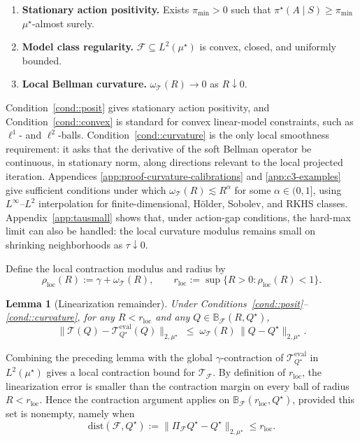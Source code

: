 \documentclass{article}
\theoremstyle{plain}
\newtheorem{lemma}{Lemma}
\theoremstyle{definition}
\theoremstyle{remark}
\begin{document}
\begin{enumerate}[label=\textbf{C\arabic*)}, ref={C\arabic*}, leftmargin=1.5em, series=cond]
\item \label{cond::posit}
\textbf{Stationary action positivity.}
Exists \(\pi_{\min}>0\) such that
\(\pi^\star(A\mid S)\ge \pi_{\min}\) \(\mu^\star\)-almost surely.

\item \label{cond::convex}
\textbf{Model class regularity.}
\(\mathcal F\subseteq L^2(\mu^\star)\) is convex, closed, and uniformly bounded.

\item \label{cond::curvature}
\textbf{Local Bellman curvature.}
\(\omega_{\mathcal T}(R)\to0\) as \(R\downarrow0\).
\end{enumerate}

Condition~\ref{cond::posit} gives stationary action positivity, and
Condition~\ref{cond::convex} is standard for convex linear-model constraints,
such as \(\ell^1\)- and \(\ell^2\)-balls. Condition~\ref{cond::curvature} is the
only local smoothness requirement: it asks that the derivative of the soft
Bellman operator be continuous, in stationary norm, along directions relevant to
the local projected iteration. Appendices \ref{app:proof-curvature-calibrations} and \ref{app:c3-examples} give sufficient conditions under
which \(\omega_{\mathcal T}(R)\lesssim R^\alpha\) for some
\(\alpha\in(0,1]\), using \(L^\infty\)--\(L^2\) interpolation for
finite-dimensional, H\"older, Sobolev, and RKHS classes.
Appendix~\ref{app:tausmall} shows that, under action-gap conditions, the
hard-max limit can also be handled: the local curvature modulus remains small on
shrinking neighborhoods as \(\tau\downarrow0\).

Define the local contraction modulus and radius by
\[
\rho_{\mathrm{loc}}(R):=\gamma+\omega_{\mathcal T}(R),
\qquad
r_{\mathrm{loc}}:=\sup\{R>0:\rho_{\mathrm{loc}}(R)<1\}.
\]


\begin{lemma}[Linearization remainder]
\label{lem:second-order-remainder}
Under Conditions~\ref{cond::posit}--\ref{cond::curvature}, for any
\(R<r_{\mathrm{loc}}\) and any
\(Q \in \mathbb B_{\mathcal F}(R,Q^\star)\),
\[
\bigl\|\mathcal{T}(Q)-\mathcal{T}^{\mathrm{eval}}_{Q^\star}(Q)\bigr\|_{2,\mu^\star}
\;\le\;
\omega_{\mathcal T}(R)\,\|Q-Q^\star\|_{2,\mu^\star}.
\]
\end{lemma}

Combining the preceding lemma with the global \(\gamma\)-contraction of
\(\mathcal T^{\mathrm{eval}}_{Q^\star}\) in \(L^2(\mu^\star)\) gives a local
contraction bound for \(\mathcal T_{\mathcal F}\). By definition of
\(r_{\mathrm{loc}}\), the linearization error is smaller than the contraction
margin on every ball of radius \(R<r_{\mathrm{loc}}\). Hence the contraction
argument applies on
\(\mathbb B_{\mathcal F}(r_{\mathrm{loc}},Q^\star)\), provided this set is
nonempty, namely when
\[
\mathrm{dist}(\mathcal F,Q^\star)
:=
\|\Pi_{\mathcal F}Q^\star-Q^\star\|_{2,\mu^\star}
\le r_{\mathrm{loc}} .
\]
\end{document}
